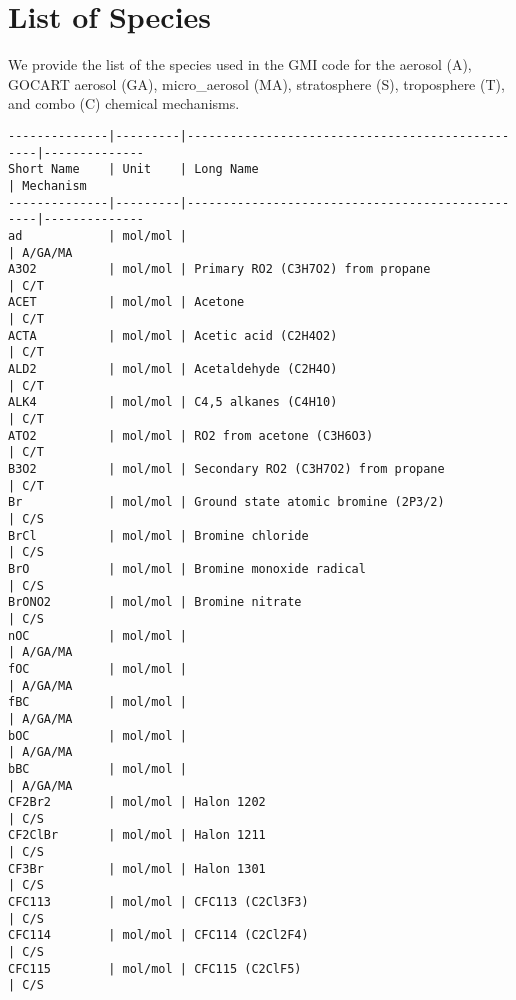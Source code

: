
\chapter[List of Species]{List of Species} \label{chap:listSpecies}
We provide the list of the species used in the GMI code for the aerosol (A),
GOCART aerosol (GA), micro\_aerosol (MA), stratosphere (S), troposphere (T), and
combo (C) chemical mechanisms.

{\small
\begin{verbatim}
--------------|---------|-------------------------------------------------|--------------
Short Name    | Unit    | Long Name                                       | Mechanism
--------------|---------|-------------------------------------------------|--------------
ad            | mol/mol |                                                 | A/GA/MA
A3O2          | mol/mol | Primary RO2 (C3H7O2) from propane               | C/T
ACET          | mol/mol | Acetone                                         | C/T
ACTA          | mol/mol | Acetic acid (C2H4O2)                            | C/T
ALD2          | mol/mol | Acetaldehyde (C2H4O)                            | C/T
ALK4          | mol/mol | C4,5 alkanes (C4H10)                            | C/T
ATO2          | mol/mol | RO2 from acetone (C3H6O3)                       | C/T
B3O2          | mol/mol | Secondary RO2 (C3H7O2) from propane             | C/T
Br            | mol/mol | Ground state atomic bromine (2P3/2)             | C/S
BrCl          | mol/mol | Bromine chloride                                | C/S
BrO           | mol/mol | Bromine monoxide radical                        | C/S
BrONO2        | mol/mol | Bromine nitrate                                 | C/S
nOC           | mol/mol |                                                 | A/GA/MA
fOC           | mol/mol |                                                 | A/GA/MA
fBC           | mol/mol |                                                 | A/GA/MA
bOC           | mol/mol |                                                 | A/GA/MA
bBC           | mol/mol |                                                 | A/GA/MA
CF2Br2        | mol/mol | Halon 1202                                      | C/S
CF2ClBr       | mol/mol | Halon 1211                                      | C/S
CF3Br         | mol/mol | Halon 1301                                      | C/S
CFC113        | mol/mol | CFC113 (C2Cl3F3)                                | C/S
CFC114        | mol/mol | CFC114 (C2Cl2F4)                                | C/S
CFC115        | mol/mol | CFC115 (C2ClF5)                                 | C/S

\end{verbatim}}
